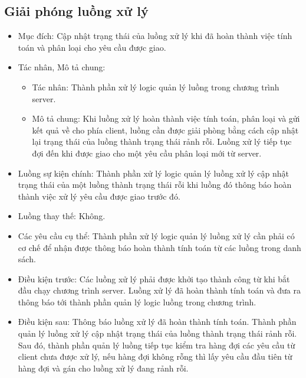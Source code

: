 \subsection{Giải phóng luồng xử lý}
\begin{itemize}
	\item Mục đích: Cập nhật trạng thái của luồng xử lý khi đã hoàn thành việc tính	toán và phân loại cho yêu cầu được giao.
	\item Tác nhân, Mô tả chung:
	\begin{itemize}
		\item Tác nhân: Thành phần xử lý logic quản lý luồng trong chương trình	server.
		\item Mô tả chung: Khi luồng xử lý hoàn thành việc tính toán, phân loại và gửi kết quả về cho phía client, luồng cần được giải phòng bằng cách cập nhật lại trạng thái của luồng thành trạng thái rảnh rỗi. Luồng xử lý tiếp tục đợi đến khi được giao cho một yêu cầu phân loại mới từ server.
	\end{itemize}
	\item Luồng sự kiện chính: Thành phần xử lý logic quản lý luồng xử lý cập nhật trạng thái của một luồng thành trạng thái rỗi khi luồng đó thông báo hoàn thành việc xử lý yêu cầu được giao trước đó.
	\item Luồng thay thế: Không.
	\item Các yêu cầu cụ thể: Thành phần xử lý logic quản lý luồng xử lý cần phải có cơ chế để nhận được thông báo hoàn thành tính toán từ các luồng trong danh sách.
	\item Điều kiện trước: Các luồng xử lý phải được khởi tạo thành công từ khi bắt	đầu chạy chương trình server. Luồng xử lý đã hoàn thành tính toán và đưa ra thông báo tới thành phần quản lý logic luồng trong chương trình.
	\item Điều kiện sau: Thông báo luồng xử lý đã hoàn thành tính toán. Thành phần quản lý luồng xử lý cập nhật trạng thái của luồng thành trạng thái rảnh rỗi. Sau đó, thành phần quản lý luồng tiếp tục kiểm tra hàng đợi các yêu cầu từ client chưa được xử lý, nếu hàng đợi không rỗng thì lấy yêu cầu đầu tiên từ	hàng đợi và gán cho luồng xử lý đang rảnh rỗi.
\end{itemize}

